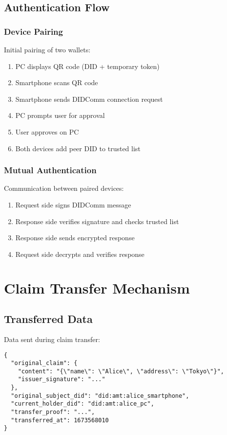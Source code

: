 \subsection{Authentication Flow}

\subsubsection{Device Pairing}

Initial pairing of two wallets:

\begin{enumerate}
  \item PC displays QR code (DID + temporary token)
  \item Smartphone scans QR code
  \item Smartphone sends DIDComm connection request
  \item PC prompts user for approval
  \item User approves on PC
  \item Both devices add peer DID to trusted list
\end{enumerate}

\subsubsection{Mutual Authentication}

Communication between paired devices:

\begin{enumerate}
  \item Request side signs DIDComm message
  \item Response side verifies signature and checks trusted list
  \item Response side sends encrypted response
  \item Request side decrypts and verifies response
\end{enumerate}

\section{Claim Transfer Mechanism}

\subsection{Transferred Data}

Data sent during claim transfer:

\begin{verbatim}
{
  "original_claim": {
    "content": "{\"name\": \"Alice\", \"address\": \"Tokyo\"}",
    "issuer_signature": "..."
  },
  "original_subject_did": "did:amt:alice_smartphone",
  "current_holder_did": "did:amt:alice_pc",
  "transfer_proof": "...",
  "transferred_at": 1673568010
}
\end{verbatim}

